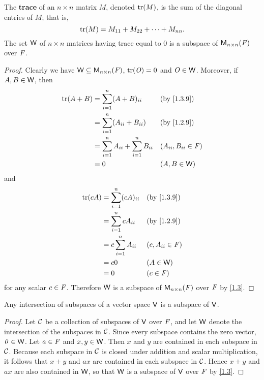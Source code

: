 \begin{eg}\label{1.3.9}
	The \textbf{trace} of an \(n \times n\) matrix \(M\), denoted \(\tr{M}\), is the sum of the diagonal entries of \(M\);
	that is,
	\[
		\tr{M} = M_{1 1} + M_{2 2} + \dots + M_{n n}.
	\]
	The set \(\mathsf{W}\) of \(n \times n\) matrices having trace equal to \(0\) is a subspace of \(\mathsf{M}_{{n} \times n}({\mathit{F}})\) over \(\mathit{F}\).
\end{eg}

\begin{proof}
	Clearly we have \(\mathsf{W} \subseteq \mathsf{M}_{{n} \times n}({\mathit{F}})\), \(\tr{\zm} = 0\) and \(\mathit{O} \in \mathsf{W}\).
	Moreover, if \(A, B \in \mathsf{W}\), then
	\begin{align*}
		\tr{A + B} & = \sum_{i = 1}^n (A + B)_{i i}                    &  & \text{(by \cref{1.3.9})}  \\
		           & = \sum_{i = 1}^n (A_{i i} + B_{i i})              &  & \text{(by \cref{1.2.9})}  \\
		           & = \sum_{i = 1}^n A_{i i} + \sum_{i = 1}^n B_{i i} &  & (A_{i i}, B_{i i} \in \F) \\
		           & = 0                                               &  & (A, B \in \W)
	\end{align*}
	and
	\begin{align*}
		\tr{cA} & = \sum_{i = 1}^n (cA)_{i i} &  & \text{(by \cref{1.3.9})} \\
		        & = \sum_{i = 1}^n cA_{i i}   &  & \text{(by \cref{1.2.9})} \\
		        & = c \sum_{i = 1}^n A_{i i}  &  & (c, A_{i i} \in \F)      \\
		        & = c0                        &  & (A \in \W)               \\
		        & = 0                         &  & (c \in \F)
	\end{align*}
	for any scalar \(c \in \mathit{F}\).
	Therefore \(\mathsf{W}\) is a subspace of \(\mathsf{M}_{{n} \times n}({\mathit{F}})\) over \(\mathit{F}\) by \cref{1.3}.
\end{proof}

\begin{thm}\label{1.4}
	Any intersection of subspaces of a vector space \(\mathsf{V}\) is a subspace of \(\mathsf{V}\).
\end{thm}

\begin{proof}
	Let \(\mathcal{C}\) be a collection of subspaces of \(\mathsf{V}\) over \(\mathit{F}\), and let \(\mathsf{W}\) denote the intersection of the subspaces in \(\mathcal{C}\).
	Since every subspace contains the zero vector, \(\mathit{0} \in \mathsf{W}\).
	Let \(a \in \mathit{F}\) and \(x, y \in \mathsf{W}\).
	Then \(x\) and \(y\) are contained in each subspace in \(\mathcal{C}\).
	Because each subspace in \(\mathcal{C}\) is closed under addition and scalar multiplication, it follows that \(x + y\) and \(ax\) are contained in each subspace in \(\mathcal{C}\).
	Hence \(x + y\) and \(ax\) are also contained in \(\mathsf{W}\), so that \(\mathsf{W}\) is a subspace of \(\mathsf{V}\) over \(\mathit{F}\) by \cref{1.3}.
\end{proof}

